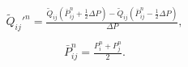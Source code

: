 \documentclass[a4paper,12pt]{extreport}
\begin{document}
    \begin{eqnarray}
        \begin{gathered}
            \tilde{Q}_{ij}'^n = \frac{\tilde{Q}_{ij}\left(\bar{P}_{ij}^n+ \frac{1}{2}\Delta P\right)-
            \tilde{Q}_{ij}\left(\bar{P}_{ij}^n-\frac{1}{2}\Delta P\right)}{{\Delta P}},
        \end{gathered}
    \end{eqnarray}
    \begin{eqnarray}
        \begin{gathered}
            \bar{P}^{n}_{ij} = \frac{P^n_i+P^n_j}{2}.
        \end{gathered}
    \end{eqnarray}
\end{document}
